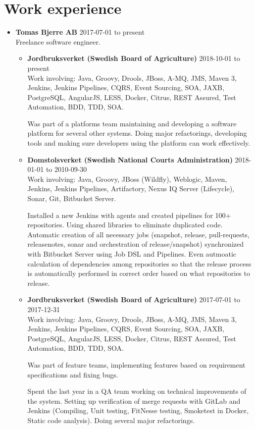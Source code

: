 \documentclass[a4paper]{article}
\begin{document}
\section*{Work experience}
\begin{itemize}
 \item \textbf{Tomas Bjerre AB} 2017-07-01 to present \\
 Freelance software engineer.
 \begin{itemize}
  \item \textbf{Jordbruksverket (Swedish Board of Agriculture)} 2018-10-01 to present \\
  Work involving: Java, Groovy, Drools, JBoss, A-MQ, JMS, Maven 3, Jenkins, Jenkins Pipelines, CQRS, Event Sourcing, SOA, JAXB, PostgreSQL, AngularJS, LESS, Docker, Citrus, REST Assured, Test Automation, BDD, TDD, SOA.

  Was part of a platforms team maintaining and developing a software platform for several other systems. Doing major refactorings, developing tools and making sure developers using the platform can work effectively.

  \item \textbf{Domstolsverket (Swedish National Courts Administration)} 2018-01-01 to 2010-09-30 \\
  Work involving: Java, Groovy, JBoss (Wildfly), Weblogic, Maven, Jenkins, Jenkins Pipelines, Artifactory, Nexus IQ Server (Lifecycle), Sonar, Git, Bitbucket Server.

  Installed a new Jenkins with agents and created pipelines for 100+ repositories. Using shared libraries to eliminate duplicated code. Automatic creation of all necessary jobs (snapshot, release, pull-requests, releasenotes, sonar and orchestration of release/snapshot) synchronized with Bitbucket Server using Job DSL and Pipelines. Even autmoatic calculation of dependencies among repositories so that the release process is automatically performed in correct order based on what repositories to release.
  \item \textbf{Jordbruksverket (Swedish Board of Agriculture)} 2017-07-01 to 2017-12-31 \\
  Work involving: Java, Groovy, Drools, JBoss, A-MQ, JMS, Maven 3, Jenkins, Jenkins Pipelines, CQRS, Event Sourcing, SOA, JAXB, PostgreSQL, AngularJS, LESS, Docker, Citrus, REST Assured, Test Automation, BDD, TDD, SOA.

  Was part of feature teams, implementing features based on requirement specifications and fixing bugs.

  Spent the last year in a QA team working on technical improvements of the system. Setting up verification of merge requests with GitLab and Jenkins (Compiling, Unit testing, FitNesse testing, Smoketest in Docker, Static code analysis). Doing several major refactorings.
 \end{itemize}
\end{itemize}
  
\end{document}
